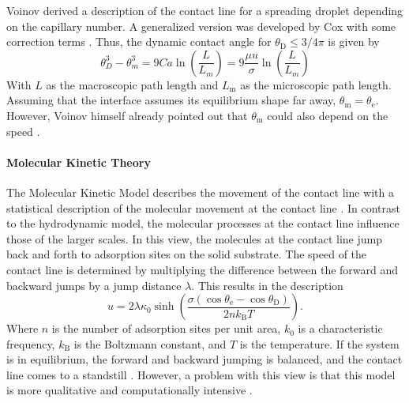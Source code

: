 Voinov \cite{voinovHydrodynamicsWetting1977} derived a description of the contact line for a spreading droplet depending on the capillary number. A generalized version was developed by Cox \cite{cox1986DynamicsSpreadingLiquids} with some correction terms \cite{carlsonCapillarityDynamicWetting2012,blake2006PhysicsMovingWetting}. Thus, the dynamic contact angle for $\theta_{\mathrm{D}} \leq 3/4 \pi$ is given by
\begin{equation}
    \label{eq: Cox-Voinov}
    \theta_D^3-\theta_m^3= 9 Ca \ln\left(\frac{L}{L_m}\right) = 9 \frac{\mu u}{\sigma}\ln\left(\frac{L}{L_m}\right)
\end{equation}
With $L$ as the macroscopic path length and $L_{\mathrm{m}}$ as the microscopic path length. Assuming that the interface assumes its equilibrium shape far away, $\theta_{\mathrm{m}} = \theta_{\mathrm{e}}$. However, Voinov himself already pointed out that $\theta_{\mathrm{m}}$ could also depend on the speed \cite{voinovHydrodynamicsWetting1977,blake2006PhysicsMovingWetting,lacisNanoscaleShearedDroplet2022}.


\paragraph{Molecular Kinetic Theory}
The Molecular Kinetic Model describes the movement of the contact line with a statistical description of the molecular movement at the contact line \cite{blake1969KineticsDisplacement}. 
In contrast to the hydrodynamic model, the molecular processes at the contact line influence those of the larger scales. In this view, the molecules at the contact line jump back and forth to adsorption sites on the solid substrate. The speed of the contact line is determined by multiplying the difference between the forward and backward jumps by a jump distance $\lambda$. This results in the description
\begin{equation}
    u=2\lambda\kappa_{0}\sinh\left(\frac{\sigma\left(\cos\theta_{\mathrm{e}}-\cos\theta_{\mathrm{D}}\right)}{2nk_{\mathrm{B}}T}\right).
\end{equation}
Where $n$ is the number of adsorption sites per unit area, $k_0$ is a characteristic frequency, $k_{\mathrm{B}}$ is the Boltzmann constant, and $T$ is the temperature.
If the system is in equilibrium, the forward and backward jumping is balanced, and the contact line comes to a standstill \cite{carlson2011DissipationRapidDynamic,blake2006PhysicsMovingWetting}. However, a problem with this view is that this model is more qualitative and computationally intensive \cite{mohammadkarim2022ReviewPhysicsMoving}.








